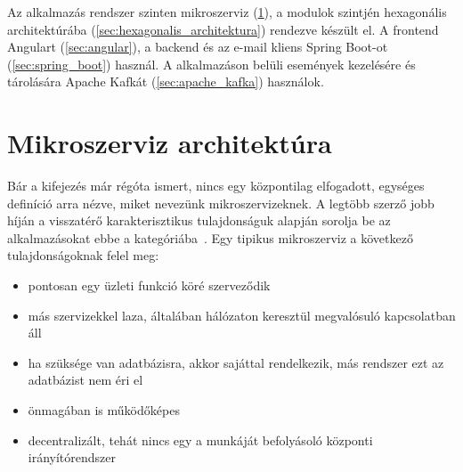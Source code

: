 Az alkalmazás rendszer szinten mikroszerviz (\ref{sec:mikroszerviz}), a modulok szintjén hexagonális architektúrába (\ref{sec:hexagonalis_architektura}) rendezve készült el. A frontend Angulart (\ref{sec:angular}), a backend és az e-mail kliens Spring Boot-ot (\ref{sec:spring_boot}) használ. A alkalmazáson belüli események kezelésére és tárolására Apache Kafkát (\ref{sec:apache_kafka}) használok.


\section{Mikroszerviz architektúra}\label{sec:mikroszerviz}
Bár a kifejezés már régóta ismert, nincs egy központilag elfogadott, egységes definíció arra nézve, miket nevezünk mikroszervizeknek. A legtöbb szerző jobb híján a visszatérő karakterisztikus tulajdonságuk alapján sorolja be az alkalmazásokat ebbe a kategóriába~\cite{OReally_Microservice_Architecture}. Egy tipikus mikroszerviz a következő tulajdonságoknak felel meg:

\begin{itemize}
	\item	pontosan egy üzleti funkció köré szerveződik 
	\item   más	szervizekkel laza, általában hálózaton keresztül megvalósuló kapcsolatban áll
	\item   ha szüksége van adatbázisra, akkor sajáttal rendelkezik, más rendszer ezt az adatbázist nem éri el
	\item	önmagában is működőképes	
	\item	decentralizált, tehát nincs egy a munkáját befolyásoló központi irányítórendszer
\end{itemize}

